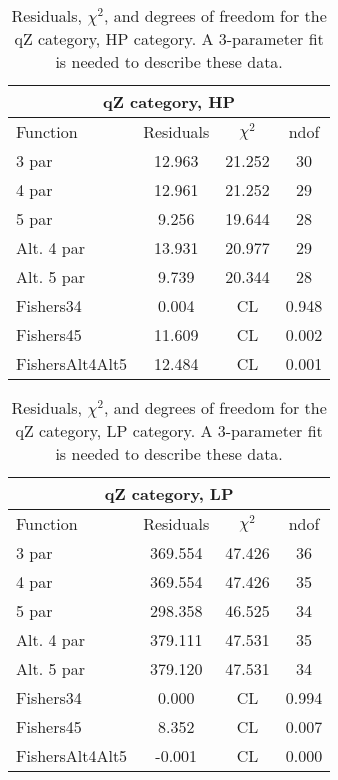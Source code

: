 \begin{table}[htb]
\centering
\begin{tabular}{|l c c c |}
\hline
\multicolumn{4}{|c|}{qZ category, HP}\\
\hline
Function & Residuals & $\chi^2$ & ndof \\
\hline
3 par & 12.963 & 21.252 & 30 \\
4 par & 12.961 & 21.252 & 29 \\
5 par & 9.256 & 19.644 & 28 \\
Alt. 4 par& 13.931 & 20.977 & 29 \\
Alt. 5 par& 9.739 & 20.344 & 28 \\
\hline
\hline
Fishers34  & 0.004 & CL & 0.948\\
Fishers45  & 11.609 & CL & 0.002\\
FishersAlt4Alt5  & 12.484 & CL & 0.001\\
\hline
\end{tabular}
\caption{Residuals, $\chi^{2}$, and degrees of freedom for the qZ category, HP category. A 3-parameter fit is needed to describe these data.}
\label{tab:qZ category, HP}
\end{table}
\begin{table}[htb]
\centering
\begin{tabular}{|l c c c |}
\hline
\multicolumn{4}{|c|}{qZ category, LP}\\
\hline
Function & Residuals & $\chi^2$ & ndof \\
\hline
3 par & 369.554 & 47.426 & 36 \\
4 par & 369.554 & 47.426 & 35 \\
5 par & 298.358 & 46.525 & 34 \\
Alt. 4 par& 379.111 & 47.531 & 35 \\
Alt. 5 par& 379.120 & 47.531 & 34 \\
\hline
\hline
Fishers34  & 0.000 & CL & 0.994\\
Fishers45  & 8.352 & CL & 0.007\\
FishersAlt4Alt5  & -0.001 & CL & 0.000\\
\hline
\end{tabular}
\caption{Residuals, $\chi^{2}$, and degrees of freedom for the qZ category, LP category. A 3-parameter fit is needed to describe these data.}
\label{tab:qZ category, LP}
\end{table}
